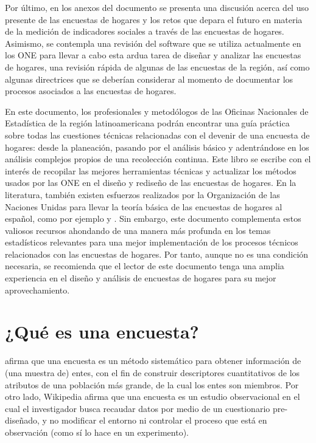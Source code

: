 \documentclass[
  12pt,
]{book}
\begin{document}
Por último, en los anexos del documento se presenta una discusión acerca del uso presente de las encuestas de hogares y los retos que depara el futuro en materia de la medición de indicadores sociales a través de las encuestas de hogares. Asimismo, se contempla una revisión del software que se utiliza actualmente en los ONE para llevar a cabo esta ardua tarea de diseñar y analizar las encuestas de hogares, una revisión rápida de algunas de las encuestas de la región, así como algunas directrices que se deberían considerar al momento de documentar los procesos asociados a las encuestas de hogares.

En este documento, los profesionales y metodólogos de las Oficinas Nacionales de Estadística de la región latinoamericana podrán encontrar una guía práctica sobre todas las cuestiones técnicas relacionadas con el devenir de una encuesta de hogares: desde la planeación, pasando por el análisis básico y adentrándose en los análisis complejos propios de una recolección continua. Este libro se escribe con el interés de recopilar las mejores herramientas técnicas y actualizar los métodos usados por las ONE en el diseño y rediseño de las encuestas de hogares. En la literatura, también existen esfuerzos realizados por la Organización de las Naciones Unidas para llevar la teoría básica de las encuestas de hogares al español, como por ejemplo \citet{UnitedNations_2005} y \citet{UnitedNations_2008}. Sin embargo, este documento complementa estos valiosos recursos ahondando de una manera más profunda en los temas estadísticos relevantes para una mejor implementación de los procesos técnicos relacionados con las encuestas de hogares. Por tanto, aunque no es una condición necesaria, se recomienda que el lector de este documento tenga una amplia experiencia en el diseño y análisis de encuestas de hogares para su mejor aprovechamiento.

\hypertarget{quuxe9-es-una-encuesta}{%
\section{¿Qué es una encuesta?}\label{quuxe9-es-una-encuesta}}

\citet{Groves_Fowler_Couper_Lepkowski_Singer_Tourangeau_2009} afirma que una encuesta es un método sistemático para obtener información de (una muestra de) entes, con el fin de construir descriptores cuantitativos de los atributos de una población más grande, de la cual los entes son miembros.
Por otro lado, Wikipedia afirma que una encuesta es un estudio observacional en el cual el investigador busca recaudar datos por medio de un cuestionario pre-diseñado, y no modificar el entorno ni controlar el proceso que está en observación (como sí lo hace en un experimento).
\end{document}
